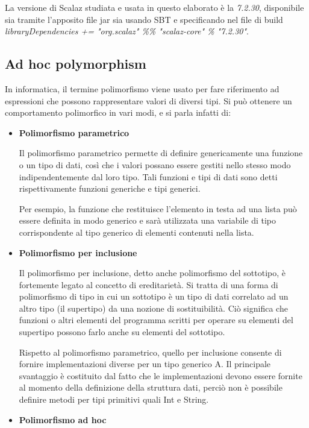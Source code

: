 La versione di Scalaz studiata e usata in questo elaborato è la \textit{7.2.30}, disponibile sia tramite l'apposito file jar sia usando SBT e specificando nel file di build \textit{libraryDependencies += "org.scalaz" \%\% "scalaz-core" \% "7.2.30"}.

\subsection{Ad hoc polymorphism}

In informatica, il termine polimorfismo viene usato per fare riferimento ad espressioni che possono rappresentare valori di diversi tipi. Si può ottenere un comportamento polimorfico in vari modi, e si parla infatti di:

\begin{itemize}
\item \textbf{Polimorfismo parametrico}

Il polimorfismo parametrico permette di definire genericamente una funzione o un tipo di dati, così che i valori possano essere gestiti nello stesso modo indipendentemente dal loro tipo. Tali funzioni e tipi di dati sono detti rispettivamente funzioni generiche e tipi generici.

Per esempio, la funzione che restituisce l'elemento in testa ad una lista può essere definita in modo generico e sarà utilizzata una variabile di tipo corrispondente al tipo generico di elementi contenuti nella lista.


\item \textbf{Polimorfismo per inclusione}

Il polimorfismo per inclusione, detto anche polimorfismo del sottotipo, è fortemente legato al concetto di ereditarietà. Si tratta di una forma di polimorfismo di tipo in cui un sottotipo è un tipo di dati correlato ad un altro tipo (il supertipo) da una nozione di sostituibilità. Ciò significa che funzioni o altri elementi del programma scritti per operare su elementi del supertipo possono farlo anche su elementi del sottotipo.

Rispetto al polimorfismo parametrico, quello per inclusione consente di fornire implementazioni diverse per un tipo generico A. Il principale svantaggio è costituito dal fatto che le implementazioni devono essere fornite al momento della definizione della struttura dati, perciò non è possibile definire metodi per tipi primitivi quali Int e String.


\item \textbf{Polimorfismo ad hoc}


\end{itemize}
